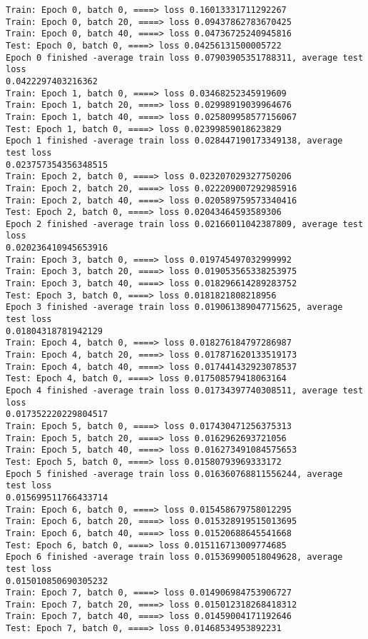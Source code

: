 \documentclass[11pt]{article}
\begin{document}
    \begin{Verbatim}[commandchars=\\\{\}]
Train: Epoch 0, batch 0, ====> loss 0.16013331711292267
Train: Epoch 0, batch 20, ====> loss 0.09437862783670425
Train: Epoch 0, batch 40, ====> loss 0.04736725240945816
Test: Epoch 0, batch 0, ====> loss 0.04256131500005722
Epoch 0 finished -average train loss 0.07903905351788311, average test loss
0.0422297403216362
Train: Epoch 1, batch 0, ====> loss 0.03468252345919609
Train: Epoch 1, batch 20, ====> loss 0.02998919039964676
Train: Epoch 1, batch 40, ====> loss 0.025809958577156067
Test: Epoch 1, batch 0, ====> loss 0.02399859018623829
Epoch 1 finished -average train loss 0.028447190173349138, average test loss
0.023757354356348515
Train: Epoch 2, batch 0, ====> loss 0.023207029327750206
Train: Epoch 2, batch 20, ====> loss 0.022209007292985916
Train: Epoch 2, batch 40, ====> loss 0.020589759573340416
Test: Epoch 2, batch 0, ====> loss 0.02043464593589306
Epoch 2 finished -average train loss 0.02166011042387809, average test loss
0.020236410945653916
Train: Epoch 3, batch 0, ====> loss 0.019745497032999992
Train: Epoch 3, batch 20, ====> loss 0.019053565338253975
Train: Epoch 3, batch 40, ====> loss 0.018296614289283752
Test: Epoch 3, batch 0, ====> loss 0.0181821808218956
Epoch 3 finished -average train loss 0.019061389047715625, average test loss
0.01804318781942129
Train: Epoch 4, batch 0, ====> loss 0.018276184797286987
Train: Epoch 4, batch 20, ====> loss 0.017871620133519173
Train: Epoch 4, batch 40, ====> loss 0.017441432923078537
Test: Epoch 4, batch 0, ====> loss 0.017508579418063164
Epoch 4 finished -average train loss 0.01734397740308511, average test loss
0.017352220229804517
Train: Epoch 5, batch 0, ====> loss 0.017430471256375313
Train: Epoch 5, batch 20, ====> loss 0.0162962693721056
Train: Epoch 5, batch 40, ====> loss 0.016273491084575653
Test: Epoch 5, batch 0, ====> loss 0.01580793969333172
Epoch 5 finished -average train loss 0.016360768811556244, average test loss
0.015699511766433714
Train: Epoch 6, batch 0, ====> loss 0.015458679758012295
Train: Epoch 6, batch 20, ====> loss 0.015328919515013695
Train: Epoch 6, batch 40, ====> loss 0.01520688645541668
Test: Epoch 6, batch 0, ====> loss 0.015116713009774685
Epoch 6 finished -average train loss 0.015369900518049628, average test loss
0.015010850690305232
Train: Epoch 7, batch 0, ====> loss 0.014906984753906727
Train: Epoch 7, batch 20, ====> loss 0.015012318268418312
Train: Epoch 7, batch 40, ====> loss 0.01459004171192646
Test: Epoch 7, batch 0, ====> loss 0.01468534953892231

\end{Verbatim}
\end{document}
